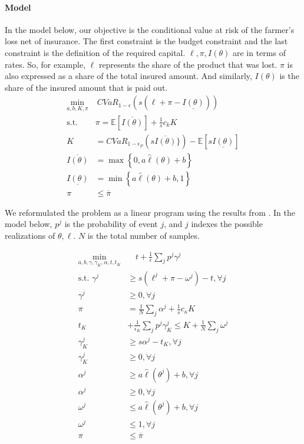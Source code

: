 \documentclass[11pt]{article}
\begin{document}
  \paragraph*{Model}
  In the model below, our objective is the conditional value at risk of the farmer's loss net of insurance. The first constraint is the budget constraint and the last constraint is the definition of the required capital. $\ell, \pi, I(\theta)$ are in terms of rates. So, for example, $\ell$ represents the share of the product that was lost. $\pi$ is also expressed as a share of the total insured amount. And similarly, $I(\theta)$ is the share of the insured amount that is paid out. 
  \begin{align}
    \min_{a,b,K,\pi} &\ CVaR_{1-\epsilon}\left(s(\ell + \pi  -  \underline{I(\theta)} )\right)\\
    \text{s.t.   } & \pi = \mathbb{E} \left [ \overline{I(\theta)} \right ] + \frac{1}{s}c_k K\\
    K &= CVaR_{1-\epsilon_P} \left( s\overline{I(\theta)} \} \right) - \mathbb{E}\left [ s\underline{I(\theta)} \right ]\\
    \overline{I(\theta)} &= \max \left \{0,a\hat{\ell}(\theta) + b \right \}\\
    \underline{I(\theta)} &= \min \left \{a\hat{\ell}(\theta)+b,1 \right \}\\
    \pi &\leq \overline{\pi}
\end{align}

  We reformulated the problem as a linear program  using the results from \cite{rockafellar2000optimization}. In the model below, $p^j$ is the probability of event $j$, and $j$ indexes the possible realizations of $\theta, \ell$. $N$ is the total number of samples. 
  
  \begin{align}
      \min_{a,b,\gamma,\gamma_K,\alpha,t,t_K} &\quad t + \frac{1}{\epsilon}\sum_j p^j \gamma^j\\
      \text{s.t.   } \gamma^j &\geq s(\ell^j + \pi - \omega^j)  - t, \forall j\\
      \gamma^j &\geq 0, \forall j \\
        \pi &= \frac{1}{N}\sum_j \alpha^j + \frac{1}{s} c_{\kappa} K\\
        t_K &+ \frac{1}{\epsilon_K} \sum_j p^j \gamma_K^j \leq K+ \frac{1}{N}\sum_j \omega^j \\
        \gamma_K^j &\geq s\alpha^j -t_K, \forall j \\
        \gamma_K^j &\geq 0, \forall j\\
        \alpha^j &\geq a \hat{\ell}(\theta^j) + b, \forall j\\
        \alpha^j &\geq 0, \forall j\\
        \omega^j &\leq a \hat{\ell}(\theta^j) + b, \forall j\\
        \omega^j &\leq 1, \forall j\\
        \pi &\leq \overline{\pi}
  \end{align}
    
\end{document}
